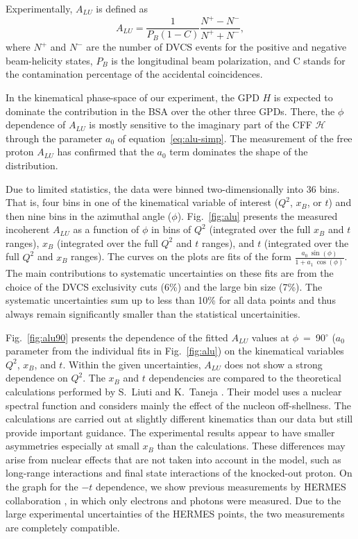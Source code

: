 \documentclass[twocolumn,nofootinbib,prl,superscriptaddress,secnumarabic,amssymb,nobibnotes,aps,floatfix]{revtex4}
\begin{document}

Experimentally, $A_{LU}$ is defined as
\begin{equation}
   A_{LU} = \frac{1}{P_{B}(1-C)} \frac{N^{+} - N^{-}}{N^{+} + N^{-} },
\end{equation}
where $N^{+}$ and $N^{-}$ are the number of DVCS events for the positive and 
negative beam-helicity states, $P_{B}$ is the longitudinal beam polarization, 
and C stands for the contamination percentage of the accidental coincidences.  

In the kinematical phase-space of our experiment, the GPD $H$ is
expected to dominate the contribution in the BSA over the other three GPDs.  
There, the $\phi$ dependence of $A_{LU}$ is mostly sensitive to the  imaginary 
part of the CFF $\mathcal{H}$ through the parameter $a_0$ of 
equation~\ref{eq:alu-simp}. The measurement of the free proton $A_{LU}$ 
\cite{Girod:2007aa} has confirmed that the $a_0$ term dominates the shape of 
the distribution.  

Due to limited statistics, the data were binned two-dimensionally into 36 bins.  
That is, four bins in one of the kinematical variable of interest ($Q^{2}$, 
$x_{B}$, or $t$) and then nine bins in the azimuthal angle ($\phi$).   
Fig.~\ref{fig:alu} presents the measured incoherent $A_{LU}$ as a function of 
$\phi$ in bins of $Q^{2}$ (integrated over the full $x_{B}$ and $t$ ranges), 
$x_{B}$ (integrated over the full $Q^{2}$ and $t$ ranges), and $t$ (integrated 
over the full $Q^{2}$ and $x_{B}$ ranges). The curves on the plots are fits of 
the form $\frac{a_{0}~\sin(\phi)}{1+ a_{1}~\cos(\phi)}$.  The main 
contributions to systematic uncertainties on these fits are from the choice of 
the DVCS exclusivity cuts (6\%) and the large bin size (7\%). The systematic 
uncertainties sum up to less than 10\% for all data points and thus always 
remain significantly smaller than the statistical uncertainities.


Fig.~\ref{fig:alu90} presents the dependence of the fitted $A_{LU}$ values at 
$\phi$~=~90$^{\circ}$ ($a_{0}$ parameter from the individual fits in 
Fig.~\ref{fig:alu}) on the kinematical variables $Q^2$, $x_{B}$, and $t$.  
Within the given uncertainties, $A_{LU}$ does not show a strong dependence on 
$Q^2$.  The $x_{B}$ and $t$ dependencies are compared to the theoretical 
calculations performed by S.~Liuti and K.~Taneja \cite{simonetta_2}. Their 
model uses a nuclear spectral function and considers mainly the effect of the 
nucleon off-shellness. The calculations are carried out at slightly different 
kinematics than our data but still provide important guidance. The experimental 
results appear to have smaller asymmetries especially at small $x_{B}$ than the 
calculations.  These differences may arise from nuclear effects that are not 
taken into account in the model, such as long-range interactions and final 
state interactions of the knocked-out proton. On the graph for the $-t$ 
dependence, we show previous measurements by HERMES collaboration 
\cite{Airapetian:2009cga}, in which only electrons and photons were measured.  
Due to the large experimental uncertainties of the HERMES points, the two 
measurements are completely compatible. 
\end{document}
